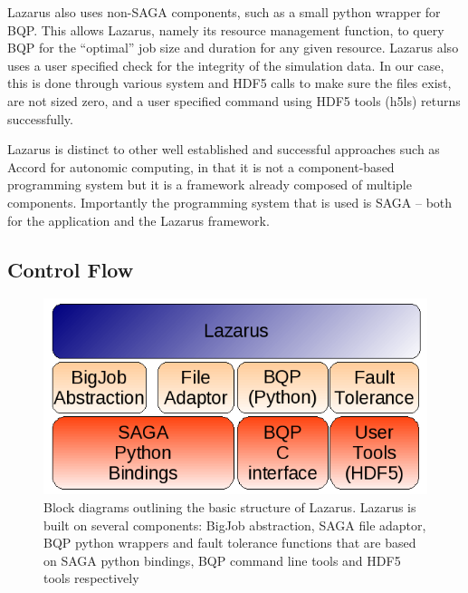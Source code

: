 \documentclass[conference,final]{IEEEtran}
\begin{document}
Lazarus also uses non-SAGA components, such as a small python wrapper
for BQP. This allows Lazarus, namely its resource management function,
to query BQP for the ``optimal'' job size and duration for any given
resource. Lazarus also uses a user specified check for the integrity
of the simulation data. In our case, this is done through various
system and HDF5 calls to make sure the files exist, are not sized
zero, and a user specified command using HDF5 tools (h5ls) returns
successfully.

Lazarus is distinct to other well established and successful
approaches such as Accord for autonomic computing, in that it is not a
component-based programming system but it is a framework already
composed of multiple components. Importantly the programming system
that is used is SAGA -- both for the application and the Lazarus
framework.

\subsection{Control Flow}

\begin{figure}
\begin{center}
\includegraphics[scale=0.5]{./figures/Architecture.png}
\caption{Block diagrams outlining the basic structure of Lazarus. Lazarus is built on
several components: BigJob abstraction, SAGA file adaptor, BQP python wrappers and fault tolerance
functions that are based on SAGA python bindings, BQP command line tools and HDF5 tools respectively
}
\end{center}

\label{fig:application_architecture}
\end{figure}
\end{document}
